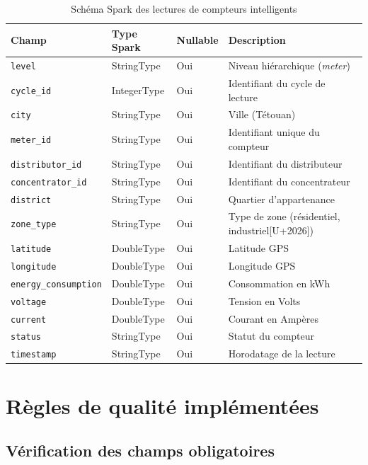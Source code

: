 \documentclass[12pt,a4paper]{report}
\begin{document}
\begin{table}[H]
\centering
\caption{Sch\'{e}ma Spark des lectures de compteurs intelligents}
\label{tab:schema_meters}
\renewcommand{\arraystretch}{1.3}
\begin{tabularx}{\textwidth}{|l|l|l|X|}
\hline
\rowcolor{primaryblue!20}
\textbf{Champ} & \textbf{Type Spark} & \textbf{Nullable} & \textbf{Description} \\
\hline
\texttt{level} & StringType & Oui & Niveau hi\'{e}rarchique (\textit{meter}) \\
\texttt{cycle\_id} & IntegerType & Oui & Identifiant du cycle de lecture \\
\texttt{city} & StringType & Oui & Ville (T\'{e}touan) \\
\texttt{meter\_id} & StringType & Oui & Identifiant unique du compteur \\
\texttt{distributor\_id} & StringType & Oui & Identifiant du distributeur \\
\texttt{concentrator\_id} & StringType & Oui & Identifiant du concentrateur \\
\texttt{district} & StringType & Oui & Quartier d'appartenance \\
\texttt{zone\_type} & StringType & Oui & Type de zone (r\'{e}sidentiel, industriel[U+2026]) \\
\texttt{latitude} & DoubleType & Oui & Latitude GPS \\
\texttt{longitude} & DoubleType & Oui & Longitude GPS \\
\texttt{energy\_consumption} & DoubleType & Oui & Consommation en kWh \\
\texttt{voltage} & DoubleType & Oui & Tension en Volts \\
\texttt{current} & DoubleType & Oui & Courant en Amp\`{e}res \\
\texttt{status} & StringType & Oui & Statut du compteur \\
\texttt{timestamp} & StringType & Oui & Horodatage de la lecture \\
\hline
\end{tabularx}
\end{table}

\section{R\`{e}gles de qualit\'{e} impl\'{e}ment\'{e}es}



\subsection{V\'{e}rification des champs obligatoires}
\end{document}
